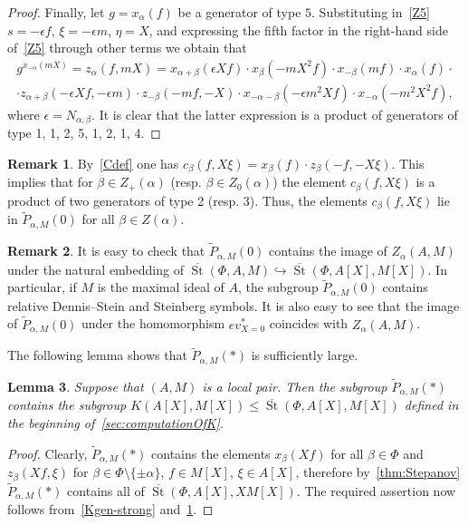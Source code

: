 \documentclass[oneside, 8pt]{amsart}
\newtheorem{lemma}{Lemma}
\theoremstyle{remark}
\theoremstyle{definition}
\numberwithin{lemma}{section}
\numberwithin{prop}{section}
\numberwithin{corollary}{section}
\numberwithin{externaltheorem}{section}
\newtheorem{rem}[lemma]{Remark}
\DeclareMathOperator{\St}{St}
\numberwithin{equation}{section}
\begin{document}
\begin{proof}
Finally, let $g = x_\alpha(f)$ be a generator of type $5$. Substituting in~\eqref{Z5} $s = -\epsilon f$, $\xi = -\epsilon m$, $\eta=X$, and expressing the fifth factor in the right-hand side of~\eqref{Z5} through other terms we obtain that
\begin{multline} \label{eq:zalpha} g^{x_{-\alpha}(mX)} = z_\alpha(f, mX) = x_{\alpha+\beta}(\epsilon Xf) \cdot x_{\beta}(-mX^2 f) \cdot x_{-\beta}(mf) \cdot x_\alpha(f) \cdot \\ 
 \cdot z_{\alpha+\beta}(-\epsilon X f, -\epsilon m) \cdot z_{-\beta}(-mf, -X) \cdot x_{-\alpha-\beta}(-\epsilon m^2X f) \cdot x_{-\alpha}(-m^2X^2 f), \end{multline}
where $\epsilon = N_{\alpha, \beta}$. It is clear that the latter expression is a product of generators of type 1, 1, 2, 5, 1, 2, 1, 4. \end{proof}

\begin{rem}\label{rem:c} By~\eqref{Cdef} one has $c_\beta(f, X\xi) = x_{\beta} (f) \cdot z_{\beta}(-f, -X\xi)$. This implies that for $\beta \in Z_+(\alpha)$ (resp. $\beta \in Z_0(\alpha)$) the element $c_\beta(f, X\xi)$ is a product of two generators of type 2 (resp. 3).
Thus, the elements $c_{\beta}(f, X\xi)$ lie in $\widetilde{P}_{\alpha, M}(0)$ for all $\beta \in Z(\alpha)$. \end{rem}
\begin{rem}\label{rem:DS}
It is easy to check that $\widetilde{P}_{\alpha, M}(0)$ contains the image of $Z_\alpha(A, M)$ under the natural embedding of $\overline{\St}(\Phi, A, M) \hookrightarrow \overline{\St}(\Phi, A[X], M[X])$.
In particular, if $M$ is the maximal ideal of $A$, the subgroup $\widetilde{P}_{\alpha, M}(0)$ contains relative Dennis--Stein and Steinberg symbols. It is also easy to see that the image of $\widetilde{P}_{\alpha, M}(0)$ under the homomorphism $ev_{X=0}^*$ coincides with $Z_\alpha(A, M)$. \end{rem}

The following lemma shows that $\widetilde{P}_{\alpha, M}(*)$ is sufficiently large.
\begin{lemma} \label{Pstar-large} Suppose that $(A, M)$ is a local pair. 
Then the subgroup $\widetilde{P}_{\alpha, M}(*)$ contains the subgroup $K(A[X], M[X]) \leq \overline{\St}(\Phi, A[X], M[X])$ defined in the beginning of~\cref{sec:computationOfK}. \end{lemma}
\begin{proof} Clearly, $\widetilde{P}_{\alpha, M}(*)$ contains the elements $x_\beta(Xf)$ for all $\beta \in \Phi$ and $z_\beta(Xf, \xi)$ for $\beta \in \Phi \setminus \{\pm \alpha\}$, $f \in M[X]$, $\xi\in A[X]$, therefore by~\cref{thm:Stepanov} $\widetilde{P}_{\alpha, M}(*)$ contains all of $\overline{\St}(\Phi, A[X], XM[X])$. The required assertion now follows from~\cref{Kgen-strong} and~\cref{rem:c}. \end{proof}
\end{document}
